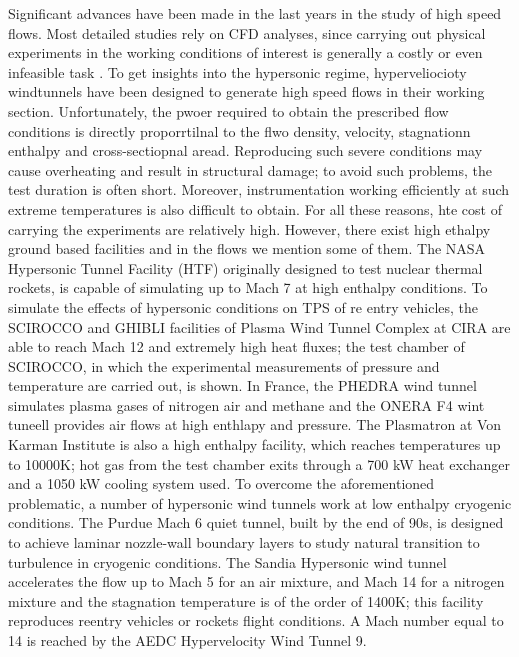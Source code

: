 Significant advances have been made in the last years in the study of high speed flows. Most detailed studies rely on CFD analyses, since carrying out physical experiments in the working conditions of interest is generally a costly or even infeasible task \citep{Bertin2006}. To get insights into the hypersonic regime, hyperveliocioty windtunnels have been designed to generate high speed flows in their working section. Unfortunately, the pwoer required to obtain the prescribed flow conditions is directly proporrtilnal to the flwo density, velocity, stagnationn enthalpy and cross-sectiopnal aread. Reproducing such severe conditions may cause overheating and result in structural damage; to avoid such problems, the test duration is often short. Moreover, instrumentation working efficiently at such extreme temperatures is also difficult to obtain. For all these reasons, hte cost of carrying the experiments are relatively high. However, there exist high ethalpy ground based facilities and in the flows we mention some of them. The NASA Hypersonic Tunnel Facility (HTF) originally designed to test nuclear thermal rockets, is capable of simulating up to Mach 7 at high enthalpy conditions. To simulate the effects of hypersonic conditions on TPS of re entry vehicles, the SCIROCCO and GHIBLI facilities of Plasma Wind Tunnel Complex at CIRA are able to reach Mach 12 and extremely high heat fluxes; the test chamber of SCIROCCO, in which the experimental measurements of pressure and temperature are carried out, is shown. In France, the PHEDRA wind tunnel simulates plasma gases of nitrogen air and methane and the ONERA F4 wint tuneell provides air flows at high enthlapy and pressure. The Plasmatron at Von Karman Institute is also a high enthalpy facility, which reaches temperatures up to 10000K; hot gas from the test chamber exits through a 700 kW heat exchanger and a 1050 kW cooling  system used. To overcome the aforementioned problematic, a number of hypersonic wind tunnels work at low enthalpy cryogenic conditions. The Purdue Mach 6 quiet tunnel, built by the end of 90s, is designed to achieve laminar nozzle-wall boundary layers to study natural transition to turbulence in cryogenic conditions. The Sandia Hypersonic wind tunnel accelerates the flow up to Mach 5 for an air mixture, and Mach 14 for a nitrogen mixture and the stagnation temperature is of the order of  1400K; this facility reproduces reentry vehicles or rockets flight conditions. A Mach number equal to 14 is reached by the AEDC Hypervelocity Wind Tunnel 9.


